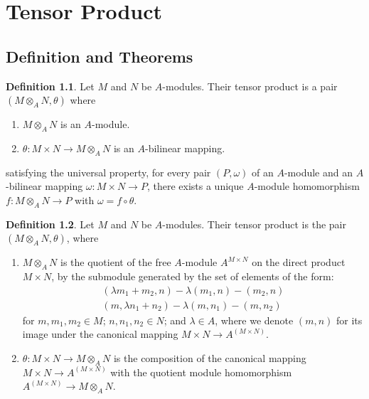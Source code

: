 \documentclass[a4paper]{book}
\theoremstyle{definition}
\newtheorem{definition}{Definition}[]
\begin{document}
\chapter{Tensor Product}
\section{Definition and Theorems}

\begin{defbox}
    \begin{definition}
        Let \(M\) and \(N\) be \(A\)-modules. Their tensor product is a pair \((M \otimes_A N, \theta)\) where
        \begin{enumerate}
            \item \(M \otimes_A N\) is an \(A\)-module.
            \item \(\theta: M \times N \rightarrow M \otimes_A N\) is an \(A\)-bilinear mapping.
        \end{enumerate}
        satisfying the universal property, for every pair \((P, \omega)\) of an \(A\)-module and an \(A\)-bilinear mapping \(\omega: M \times N \rightarrow P\), there exists a unique \(A\)-module homomorphism \(f: M \otimes_A N \rightarrow P\) with \(\omega = f \circ \theta\).
    \end{definition}
\end{defbox}

\begin{defbox}
    \begin{definition}
        Let \(M\) and \(N\) be \(A\)-modules. Their tensor product is the pair \((M \otimes_A N, \theta)\), where
        \begin{enumerate}
            \item \(M \otimes_A N\) is the quotient of the free \(A\)-module \(A^{M \times N}\) on the direct product \(M \times N\), by the submodule generated by the set of elements of the form:
            \begin{align*}
                (\lambda m_1 + m_2, n) - \lambda (m_1, n) - (m_2, n) \\
                (m, \lambda n_1 + n_2) - \lambda (m, n_1) - (m, n_2)
            \end{align*}
            for \(m, m_1, m_2 \in M\); \(n, n_1, n_2 \in N\); and \(\lambda \in A\), where we denote \((m, n)\) for its image under the canonical mapping \(M \times N \rightarrow A^{(M \times N)}\).
            \item \(\theta: M \times N \rightarrow M \otimes_A N\) is the composition of the canonical mapping \(M \times N \rightarrow A^{(M \times N)}\) with the quotient module homomorphism \(A^{(M \times N)} \rightarrow M \otimes_A N\).
        \end{enumerate}
    \end{definition}
\end{defbox}
\end{document}
